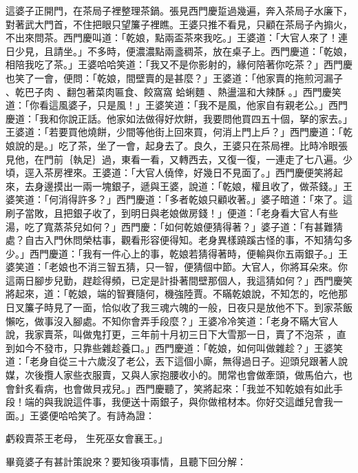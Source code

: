 \begin{showcontents}{}
這婆子正開門，在茶局子裡整理茶鍋。張見西門慶踅過幾遍，奔入茶局子水廉下，對著武大門首，不住把眼只望簾子裡瞧。王婆只推不看見，只顧在茶局子內搧火，不出來問茶。西門慶叫道：「乾娘，點兩盃茶來我吃。」王婆道：「大官人來了！連日少見，且請坐。」不多時，便濃濃點兩盞稠茶，放在桌子上。西門慶道：「乾娘，相陪我吃了茶。」王婆哈哈笑道：「我又不是你影射的，緣何陪著你吃茶？」西門慶也笑了一會，便問：「乾娘，間壁賣的是甚麼？」王婆道：「他家賣的拖煎河漏子 、乾巴子肉 、翻包著菜肉匾食、餃窩窩 蛤蜊麵 、熱盪溫和大辣酥 。」西門慶笑道：「你看這風婆子，只是風！」王婆笑道：「我不是風，他家自有親老公。」西門慶道：「我和你說正話。他家如法做得好炊餅，我要問他買四五十個，拏的家去。」王婆道：「若要買他燒餅，少間等他街上回來買，何消上門上戶？」西門慶道：「乾娘說的是。」吃了茶，坐了一會，起身去了。良久，王婆只在茶局裡。比時冷眼張見他，在門前｛執足｝過，東看一看，又轉西去，又復一復，一連走了七八遍。少頃，逕入茶房裡來。王婆道：「大官人僥倖，好幾日不見面了。」西門慶便笑將起來，去身邊摸出一兩一塊銀子，遞與王婆，說道：「乾娘，權且收了，做茶錢。」王婆笑道：「何消得許多？」西門慶道：「多者乾娘只顧收著。」婆子暗道：「來了。這刷子當敗，且把銀子收了，到明日與老娘做房錢！」便道：「老身看大官人有些湯，吃了寬蒸茶兒如何？」西門慶：「如何乾娘便猜得著？」婆子道：「有甚難猜處？自古入門休問榮枯事，觀看形容便得知。老身異樣蹺蹊古怪的事，不知猜勾多少。」西門慶道：「我有一件心上的事，乾娘若猜得著時，便輸與你五兩銀子。」王婆笑道：「老娘也不消三智五猜，只一智，便猜個中節。大官人，你將耳朵來。你這兩日腳步兒勤，趕趁得頻，已定是計掛著間壁那個人，我這猜如何？」西門慶笑將起來，道：「乾娘，端的智賽隨何，機強陸賈。不瞞乾娘說，不知怎的，吃他那日叉簾子時見了一面，恰似收了我三魂六魄的一般，日夜只是放他不下。到家茶飯懶吃，做事沒入腳處。不知你會弄手段麼？」王婆冷冷笑道：「老身不瞞大官人說，我家賣茶，叫做鬼打更，三年前十月初三日下大雪那一日，賣了不泡茶 ，直到如今不發市，只靠些雜趁養口。」西門慶道：「乾娘，如何叫做雜趁？」王婆笑道：「老身自從三十六歲沒了老公，丟下這個小廝，無得過日子。迎頭兒跟著人說媒，次後攬人家些衣服賣，又與人家抱腰收小的。閒常也會做牽頭，做馬伯六，也會針炙看病，也會做貝戎兒。」西門慶聽了，笑將起來：「我並不知乾娘有如此手段！端的與我說這件事，我便送十兩銀子，與你做棺材本。你好交這雌兒會我一面。」王婆便哈哈笑了。有詩為證：

虧殺賣茶王老母，  生死巫女會襄王。」

畢竟婆子有甚計策說來？要知後項事情，且聽下回分解：




\end{showcontents}

